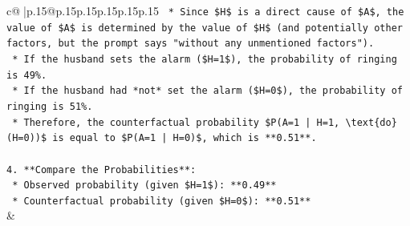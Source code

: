 \documentclass{article}
\begin{document}
{\begin{supertabular}{c@{$\;$}|p{.15\linewidth}@{}p{.15\linewidth}p{.15\linewidth}p{.15\linewidth}p{.15\linewidth}p{.15\linewidth}}
{{{\texttt{    *   Since \$H\$ is a direct cause of \$A\$, the value of \$A\$ is determined by the value of \$H\$ (and potentially other factors, but the prompt says "without any unmentioned factors").} \\
\texttt{    *   If the husband sets the alarm (\$H=1\$), the probability of ringing is 49\%.} \\
\texttt{    *   If the husband had *not* set the alarm (\$H=0\$), the probability of ringing is 51\%.} \\
\texttt{    *   Therefore, the counterfactual probability \$P(A=1 | H=1, \textbackslash{}text\{do\}(H=0))\$ is equal to \$P(A=1 | H=0)\$, which is **0.51**.} \\
\\ 
\texttt{4.  **Compare the Probabilities**:} \\
\texttt{    *   Observed probability (given \$H=1\$): **0.49**} \\
\texttt{    *   Counterfactual probability (given \$H=0\$): **0.51**} \\
            }
        }
    }
    & \\ \\


\end{supertabular}}
\end{document}
